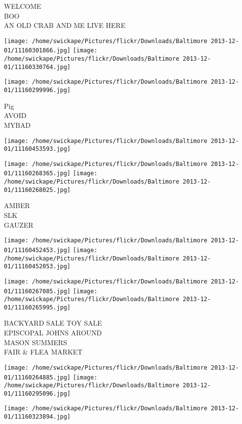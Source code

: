 \documentclass[10pt,letterpaper]{article}
\begin{document}
WELCOME\\
BOO\\
AN OLD CRAB AND ME LIVE HERE
\pagebreak

\texttt{[image: /home/swickape/Pictures/flickr/Downloads/Baltimore 2013-12-01/11160301866.jpg]}
\texttt{[image: /home/swickape/Pictures/flickr/Downloads/Baltimore 2013-12-01/11160330764.jpg]}

\texttt{[image: /home/swickape/Pictures/flickr/Downloads/Baltimore 2013-12-01/11160299996.jpg]}

Pig\\
AVOID\\
MYBAD
\pagebreak

\texttt{[image: /home/swickape/Pictures/flickr/Downloads/Baltimore 2013-12-01/11160453593.jpg]}

\vspace{0.25in}
\texttt{[image: /home/swickape/Pictures/flickr/Downloads/Baltimore 2013-12-01/11160268365.jpg]}
\texttt{[image: /home/swickape/Pictures/flickr/Downloads/Baltimore 2013-12-01/11160268025.jpg]}

AMBER\\
SLK\\
GAUZER
\pagebreak

\texttt{[image: /home/swickape/Pictures/flickr/Downloads/Baltimore 2013-12-01/11160452453.jpg]}
\texttt{[image: /home/swickape/Pictures/flickr/Downloads/Baltimore 2013-12-01/11160452053.jpg]}

\texttt{[image: /home/swickape/Pictures/flickr/Downloads/Baltimore 2013-12-01/11160267085.jpg]}
\texttt{[image: /home/swickape/Pictures/flickr/Downloads/Baltimore 2013-12-01/11160265995.jpg]}

BACKYARD SALE TOY SALE\\
EPISCOPAL JOHNS AROUND\\
MASON SUMMERS\\
FAIR \& FLEA MARKET
\pagebreak

\texttt{[image: /home/swickape/Pictures/flickr/Downloads/Baltimore 2013-12-01/11160264885.jpg]}
\texttt{[image: /home/swickape/Pictures/flickr/Downloads/Baltimore 2013-12-01/11160295096.jpg]}

\vspace{0.25in}
\texttt{[image: /home/swickape/Pictures/flickr/Downloads/Baltimore 2013-12-01/11160323894.jpg]}
\end{document}
